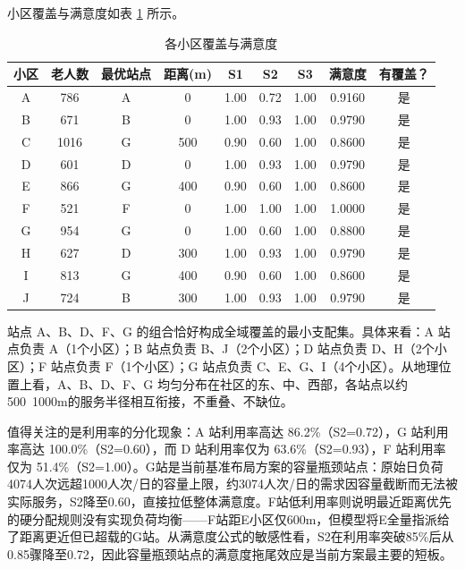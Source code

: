 \documentclass[UTF8]{ctexart}
\begin{document}
小区覆盖与满意度如表 \ref{tab:coverage} 所示。

\begin{table}[H]
\centering
\caption{各小区覆盖与满意度}
\label{tab:coverage}
\renewcommand{\arraystretch}{1.3}
\begin{tabular}{|c|c|c|c|c|c|c|c|c|}
\hline
\textbf{小区} & \textbf{老人数} & \textbf{最优站点} & \textbf{距离(m)} & \textbf{S1} & \textbf{S2} & \textbf{S3} & \textbf{满意度} & \textbf{有覆盖？} \\
\hline
A & 786 & A & 0 & 1.00 & 0.72 & 1.00 & 0.9160 & 是 \\
B & 671 & B & 0 & 1.00 & 0.93 & 1.00 & 0.9790 & 是 \\
C & 1016 & G & 500 & 0.90 & 0.60 & 1.00 & 0.8600 & 是 \\
D & 601 & D & 0 & 1.00 & 0.93 & 1.00 & 0.9790 & 是 \\
E & 866 & G & 400 & 0.90 & 0.60 & 1.00 & 0.8600 & 是 \\
F & 521 & F & 0 & 1.00 & 1.00 & 1.00 & 1.0000 & 是 \\
G & 954 & G & 0 & 1.00 & 0.60 & 1.00 & 0.8800 & 是 \\
H & 627 & D & 300 & 1.00 & 0.93 & 1.00 & 0.9790 & 是 \\
I & 813 & G & 400 & 0.90 & 0.60 & 1.00 & 0.8600 & 是 \\
J & 724 & B & 300 & 1.00 & 0.93 & 1.00 & 0.9790 & 是 \\
\hline
\end{tabular}
\end{table}

站点 A、B、D、F、G 的组合恰好构成全域覆盖的最小支配集。具体来看：A 站点负责 A（1个小区）；B 站点负责 B、J（2个小区）；D 站点负责 D、H（2个小区）；F 站点负责 F（1个小区）；G 站点负责 C、E、G、I（4个小区）。从地理位置上看，A、B、D、F、G 均匀分布在社区的东、中、西部，各站点以约500~1000m的服务半径相互衔接，不重叠、不缺位。

值得关注的是利用率的分化现象：A 站利用率高达 86.2\%（S2=0.72），G 站利用率高达 100.0\%（S2=0.60），而 D 站利用率仅为 63.6\%（S2=0.93），F 站利用率仅为 51.4\%（S2=1.00）。G站是当前基准布局方案的容量瓶颈站点：原始日负荷4074人次远超1000人次/日的容量上限，约3074人次/日的需求因容量截断而无法被实际服务，S2降至0.60，直接拉低整体满意度。F站低利用率则说明最近距离优先的硬分配规则没有实现负荷均衡——F站距E小区仅600m，但模型将E全量指派给了距离更近但已超载的G站。从满意度公式的敏感性看，S2在利用率突破85\%后从0.85骤降至0.72，因此容量瓶颈站点的满意度拖尾效应是当前方案最主要的短板。
\end{document}
